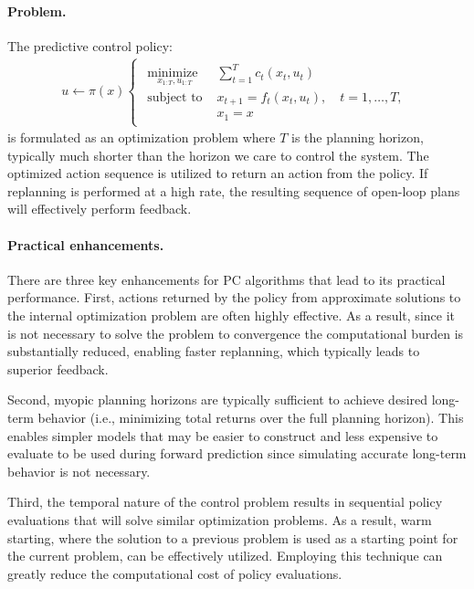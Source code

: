\paragraph{Problem.}
The predictive control policy:
\begin{align}
	u \leftarrow \pi(x)
	\begin{cases}
		\begin{array}{ll}
			\underset{x_{1:T}, u_{1:T}}{\mbox{minimize }}  & \sum \limits_{t = 1}^{T} c_t(x_t, u_t) \\
			\mbox{subject to } & x_{t+1} = f_t(x_t, u_t),  \quad t = 1, \dots, T,\\
			& x_1 = x
		\end{array}
	\end{cases}
	\label{intro_mpc_policy}
\end{align}
is formulated as an optimization problem where $T$ is the planning horizon, typically much shorter than the horizon we care to control the system. The optimized action sequence is utilized to return an action from the policy. If replanning is performed at a high rate, the resulting sequence of open-loop plans will effectively perform feedback.

\paragraph{Practical enhancements.} There are three key enhancements for PC algorithms that lead to its practical performance. First, actions returned by the policy from approximate solutions to the internal optimization problem are often highly effective. As a result, since it is not necessary to solve the problem to convergence the computational burden is substantially reduced, enabling faster replanning, which typically leads to superior feedback. 

Second, myopic planning horizons are typically sufficient to achieve desired long-term behavior (i.e., minimizing total returns over the full planning horizon). This enables simpler models that may be easier to construct and less expensive to evaluate to be used during forward prediction since simulating accurate long-term behavior is not necessary. 

Third, the temporal nature of the control problem results in sequential policy evaluations that will solve similar optimization problems. As a result, warm starting, where the solution to a previous problem is used as a starting point for the current problem, can be effectively utilized. Employing this technique can greatly reduce the computational cost of policy evaluations.


